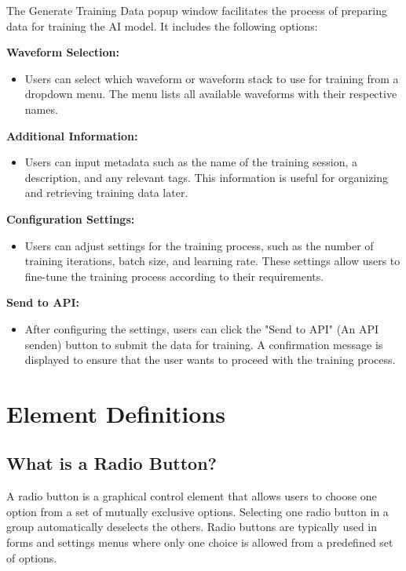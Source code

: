 \documentclass[]{scrreprt}
\begin{document}
The Generate Training Data popup window facilitates the process of preparing data for training the AI model. It includes the following options:

\textbf{Waveform Selection:}
\begin{itemize}
    \item Users can select which waveform or waveform stack to use for training from a dropdown menu. The menu lists all available waveforms with their respective names.
\end{itemize}

\textbf{Additional Information:}
\begin{itemize}
    \item Users can input metadata such as the name of the training session, a description, and any relevant tags. This information is useful for organizing and retrieving training data later.
\end{itemize}

\textbf{Configuration Settings:}
\begin{itemize}
    \item Users can adjust settings for the training process, such as the number of training iterations, batch size, and learning rate. These settings allow users to fine-tune the training process according to their requirements.
\end{itemize}

\textbf{Send to API:}
\begin{itemize}
    \item After configuring the settings, users can click the "Send to API" (An API senden) button to submit the data for training. A confirmation message is displayed to ensure that the user wants to proceed with the training process.
\end{itemize}

\section{Element Definitions}

\subsection{What is a Radio Button?} \label{cap:RadioButton}

A radio button is a graphical control element that allows users to choose one option from a set of mutually exclusive options. Selecting one radio button in a group automatically deselects the others. Radio buttons are typically used in forms and settings menus where only one choice is allowed from a predefined set of options.
\end{document}
